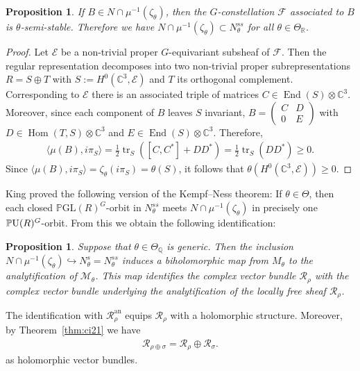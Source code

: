 \documentclass[10pt,a4paper]{amsart}
\numberwithin{equation}{section}
\newcommand{\cR}{\mathcal{R}}
\newcommand{\sE}{\mathscr{E}}
\newcommand{\sF}{\mathscr{F}}
\newcommand{\sM}{\mathscr{M}}
\newcommand{\sR}{\mathscr{R}}
\newcommand{\Q}{{\mathbb Q}}
\newcommand{\R}{{\mathbb R}}
\newcommand{\C}{{\mathbb C}}
\newcommand{\GL}{\mathrm{GL}}
\newcommand{\PU}{{\mathbb P}{\rm U}}
\newcommand{\PGL}{{\mathbb P}\GL}
\newcommand{\End}{\operatorname{End}}
\newcommand{\Hom}{\operatorname{Hom}}
\newcommand{\into}{\hookrightarrow}
\newcommand{\tr}{\operatorname{tr}}
\newcommand{\an}{\mathrm{an}}
\newtheorem{Proposition}[Theorem]{Proposition}
 { \theoremstyle{definition}
\newtheorem{Definition}[Theorem]{Definition}
\newtheorem{Remark}[Theorem]{Remark} }
\begin{document}
\begin{Proposition}
  If $B\in N \cap \mu^{-1}(\zeta_\theta)$, then the $G$-constellation $\sF$
  associated to $B$ is $\theta$-semi-stable. Therefore we have
  $N\cap \mu^{-1}(\zeta_\theta) \subset N^{ss}_\theta$ for all $\theta \in
  \Theta_\R$.
\end{Proposition}

\begin{proof}
  Let $\sE$ be a non-trivial proper $G$-equivariant subsheaf of
  $\sF$.  Then the regular representation decomposes into two
  non-trivial proper subrepresentations $ R=S\oplus T$ with
  $S:=H^0(\C^3, \sE)$ and $T$ its orthogonal complement. Corresponding
  to $\sE$ there is an associated triple of matrices
  $C\in\End(S)\otimes \C^3$.  Moreover, since each component of $B$
  leaves $S$ invariant, $B= \left(\begin{smallmatrix} C & D \\ 0 &
      E \end{smallmatrix}\right)$ with $D\in\Hom(T,S)\otimes\C^3$ and $E \in \End(S)\otimes\C^3$.
  Therefore,
  \begin{gather*}
    \langle \mu(B),i\pi_S\rangle
    =\tfrac{1}{2}\tr_S([C,C^*]+DD^*)
    =\tfrac{1}{2}\tr_S(DD^*) \geq 0.
  \end{gather*}
  Since $\langle \mu(B), i \pi_S\rangle  = \zeta_\theta (i\pi_S) = \theta (S)$, it
  follows that $\theta(H^0(\C^3, \sE))\geq 0$.
\end{proof}

King \cite[Theorem~6.1]{King1994} proved the following version of the
Kempf--Ness theorem: If $\theta \in \Theta$, then each closed
$\PGL(R)^G$-orbit in $N^{ss}_\theta$ meets $N\cap
\mu^{-1}(\zeta_\theta)$ in precisely one $\PU(R)^G$-orbit.  From this
we obtain the following identif\/ication:

\begin{Proposition}\label{prop:git-kahler}
  Suppose that $\theta\in\Theta_\Q$ is generic.  Then the inclusion
  $N\cap \mu^{-1}(\zeta_\theta)\into N^s_\theta=N^{ss}_\theta$ induces
  a biholomorphic map from $M_\theta$ to the analytification of
  $\sM_\theta$.  This map identifies the complex vector bundle
  $\cR_\rho$ with the complex vector bundle underlying the
  analytification of the locally free sheaf $\sR_\rho$.
\end{Proposition}

The identif\/ication with $\sR_\rho^\an$ equips $\cR_\rho$ with a
holomorphic structure. Moreover, by Theorem~\ref{thm:ci21} we have
\begin{gather*}%
  \cR_{\rho\oplus\sigma}=\cR_\rho\oplus\cR_\sigma.
\end{gather*}
as holomorphic vector bundles.
\end{document}

